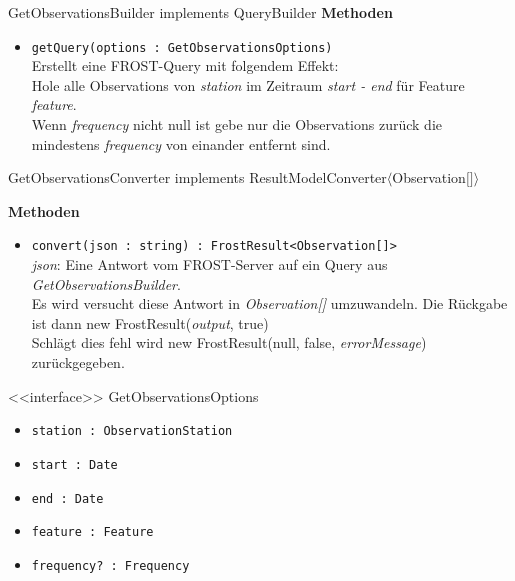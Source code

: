\begin{Class}{GetObservationsBuilder implements QueryBuilder}
    \textbf{Methoden}
    \begin{itemize}
        \item \texttt{getQuery(options : GetObservationsOptions)}
        \\ Erstellt eine FROST-Query mit folgendem Effekt:
        \\ Hole alle Observations von \emph{station} im Zeitraum \emph{start - end}
        für Feature \emph{feature}.
        \\ Wenn \emph{frequency} nicht null ist gebe nur die Observations zurück 
        die mindestens \emph{frequency} von einander entfernt sind.
    \end{itemize}
\end{Class}

\begin{Class}{GetObservationsConverter implements ResultModelConverter$\langle$Observation$\lbrack\rbrack\rangle$}

    \textbf{Methoden}
    \begin{itemize}
        \item \texttt{convert(json : string) : FrostResult<Observation[]>}
        \\ \emph{json}: Eine Antwort vom FROST-Server auf ein Query aus \emph{GetObservationsBuilder}.
        \\ Es wird versucht diese Antwort in \emph{Observation[]} umzuwandeln.
        Die Rückgabe ist dann new FrostResult(\emph{output}, true)
        \\ Schlägt dies fehl wird new FrostResult(null, false, \emph{errorMessage}) zurückgegeben.
    \end{itemize}
\end{Class}

\begin{Class}{<<interface>> GetObservationsOptions}
\begin{itemize}
    \item \texttt{station : ObservationStation}
    \item \texttt{start : Date}
    \item \texttt{end : Date}
    \item \texttt{feature : Feature}
    \item \texttt{frequency? : Frequency}
\end{itemize}
\end{Class}


